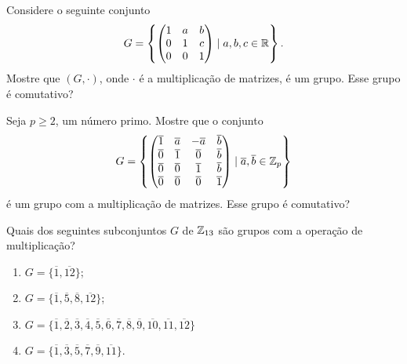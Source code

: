\documentclass[12pt]{exam}
\begin{document}
    \vspace{.3cm}

    \questao{} Considere o seguinte conjunto
    \[
    G = \left\{\begin{pmatrix} 1 & a & b\\ 0 & 1 & c \\ 0 & 0 & 1\end{pmatrix} \mid a, b, c \in \mathbb{R}\right\}.
    \]
    Mostre que $(G, \cdot)$, onde $\cdot$ é a multiplicação de matrizes, é um grupo. Esse grupo é comutativo?

    \vspace{.3cm}

    \questao{} Seja $p \ge 2$, um número primo. Mostre que o conjunto
    \[
    G = \left\{
    \begin{pmatrix}
        \overline{1} & \overline{a} & -\overline{a} & \overline{b}\\
        \overline{0} & \overline{1} & \overline{0} & \overline{b}\\
        \overline{0} & \overline{0} & \overline{1} & \overline{b}\\
        \overline{0} & \overline{0} & \overline{0} & \overline{1}\\
    \end{pmatrix}
    \mid \overline{a}, \overline{b} \in \mathbb{Z}_p
    \right\}
    \]
    é um grupo com a multiplicação de matrizes. Esse grupo é comutativo?
    \vspace{.3cm}

    \questao{} Quais dos seguintes subconjuntos $G$ de $\mathbb{Z}_{13}$ são grupos
    com a operação de multiplicação?
    \begin{multicols}{2}
        \begin{enumerate}[label=({\alph*})]
            \item $G=\{\overline{1},\overline{12}\}$;

            \item $G=\{\overline{1},\overline{5},\overline{8},\overline{12}\}$;

            \item $G=\{\overline{1},\overline{2},\overline{3},\overline{4}, \overline{5},\overline{6},\overline{7}, \overline{8},\overline{9},\overline{10},\overline{11},\overline{12}\}$

            \item $G=\{\overline{1}, \overline{3},\overline{5},\overline{7},\overline{9},\overline{11}\}$.
        \end{enumerate}
    \end{multicols}
\end{document}
